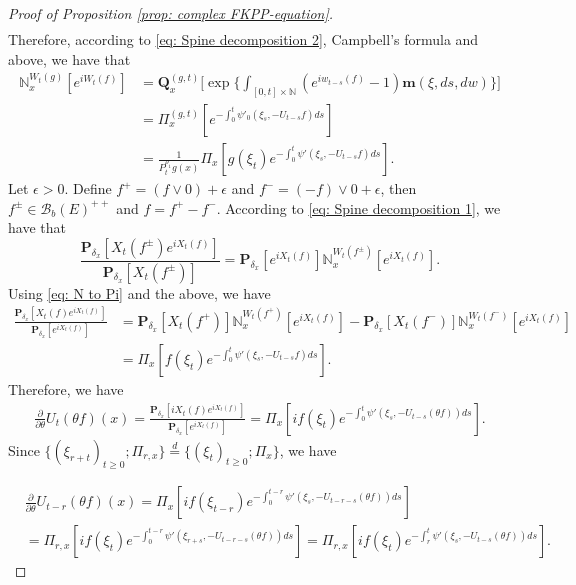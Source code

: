 \documentclass[12pt,a4paper]{amsart}
\theoremstyle{plain}
\theoremstyle{definition}
\numberwithin{equation}{section}
\begin{document}
\begin{proof}[Proof of Proposition \ref{prop: complex FKPP-equation}]
\begin{equation}
\begin{split}
\end{split}\end{equation}
    Therefore, according to \eqref{eq: Spine decomposition 2}, Campbell's formula and above, we have that
\begin{equation}\begin{split}
\label{eq: N to Pi}
    \mathbb N_x^{W_t(g)}[e^{i W_t(f)}]
    &=\mathbf Q_x^{(g,t)} \Big[\exp\Big\{\int_{[0,t]\times \mathbb N}(e^{i w_{t-s}(f)} - 1) \mathbf m(\xi, ds,dw)\Big\}\Big]
    \\&= \Pi_x^{(g,t)} [e^{-\int_0^t \psi'_0(\xi_s, -U_{t-s}f)ds}]
    \\&= \frac{1}{P_t^{\rho_1} g (x)} \Pi_x[ g(\xi_t) e^{-\int_0^t \psi'(\xi_s, -U_{t-s}f)ds} ].
\end{split}\end{equation}
    Let $\epsilon >0$.
    Define $f^+ = (f \vee 0) + \epsilon$ and $f^- = (-f) \vee 0 + \epsilon$, then $f^\pm \in \mathcal B_b(E)^{++}$ and $f = f^+ - f^-$.
    According to \eqref{eq: Spine decomposition 1}, we have that
\begin{equation}
    \frac{\mathbf P_{\delta_x}[X_t(f^{\pm})e^{i X_t(f)}]}{\mathbf P_{\delta_x}[X_t(f^{\pm})]}
    = \mathbf P_{\delta_x}[e^{i X_t(f)}] \mathbb N_x^{W_t(f^{\pm})}[e^{i X_t(f)}].
\end{equation}
    Using \eqref{eq: N to Pi} and the above, we have
\begin{equation}\begin{split}
    \frac{\mathbf P_{\delta_x}[X_t(f)e^{i X_t(f)}] }{\mathbf P_{\delta_x}[e^{i X_t(f)}]}
    &= \mathbf P_{\delta_x}[X_t(f^+)] \mathbb N_x^{W_t(f^+)} [e^{i X_t(f)}] - \mathbf P_{\delta_x}[X_t(f^-)]\mathbb N_x^{W_t(f^-)}[e^{i X_t(f)}]
    \\& = \Pi_x[ f(\xi_t) e^{- \int_0^t \psi'(\xi_s, -U_{t-s}f) ds}  ].
\end{split}\end{equation}
    Therefore, we have
\begin{equation}\begin{split}
    \frac{\partial}{\partial \theta} {U_t(\theta f)(x)}
    = \frac{\mathbf P_{\delta_x}[iX_t(f)e^{i X_t(f)}] }{\mathbf P_{\delta_x}[e^{i X_t(f)}]}
    =  \Pi_x[ if(\xi_t) e^{ - \int_0^t \psi'(\xi_s, -U_{t-s}(\theta f)) ds} ].
\end{split}\end{equation}
    Since $\{(\xi_{r+t})_{t \geq 0}; \Pi_{r,x}\} \overset{d}{=} \{(\xi_{t})_{t\geq 0}; \Pi_{x}\} $, we have

\begin{equation}\begin{split}
    &\frac{\partial}{\partial \theta} U_{t-r}(\theta f)( x)
    = \Pi_x[ i f(\xi_{t-r}) e^{-\int_0^{t-r} \psi'(\xi_s, -U_{t-r-s}(\theta f)) ds} ]
    \\&= \Pi_{r,x}[i f(\xi_t)e^{-\int_0^{t-r} \psi'(\xi_{r+s}, -U_{t-r-s}(\theta f)) ds} ]
    = \Pi_{r,x}[if(\xi_t)e^{-\int_r^t \psi'(\xi_{s}, -U_{t-s}(\theta f)) ds} ].
\end{split}\end{equation}


\end{proof}
\end{document}
